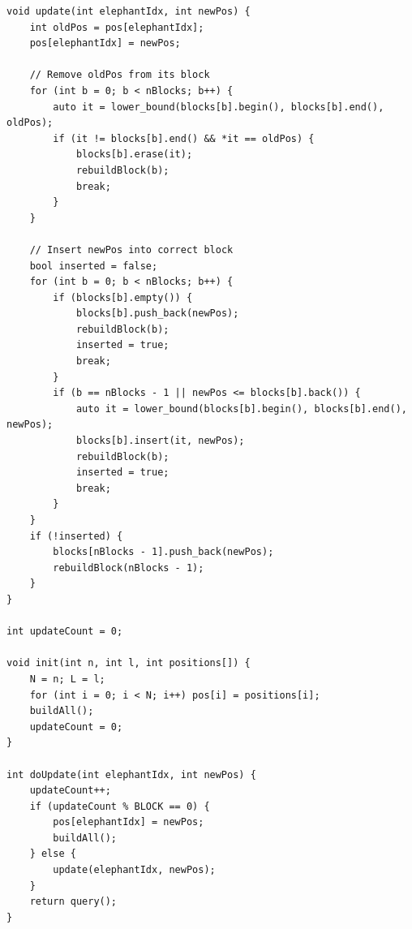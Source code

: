 \documentclass[11pt,a4paper]{article}
\begin{document}
\begin{lstlisting}
void update(int elephantIdx, int newPos) {
    int oldPos = pos[elephantIdx];
    pos[elephantIdx] = newPos;

    // Remove oldPos from its block
    for (int b = 0; b < nBlocks; b++) {
        auto it = lower_bound(blocks[b].begin(), blocks[b].end(), oldPos);
        if (it != blocks[b].end() && *it == oldPos) {
            blocks[b].erase(it);
            rebuildBlock(b);
            break;
        }
    }

    // Insert newPos into correct block
    bool inserted = false;
    for (int b = 0; b < nBlocks; b++) {
        if (blocks[b].empty()) {
            blocks[b].push_back(newPos);
            rebuildBlock(b);
            inserted = true;
            break;
        }
        if (b == nBlocks - 1 || newPos <= blocks[b].back()) {
            auto it = lower_bound(blocks[b].begin(), blocks[b].end(), newPos);
            blocks[b].insert(it, newPos);
            rebuildBlock(b);
            inserted = true;
            break;
        }
    }
    if (!inserted) {
        blocks[nBlocks - 1].push_back(newPos);
        rebuildBlock(nBlocks - 1);
    }
}

int updateCount = 0;

void init(int n, int l, int positions[]) {
    N = n; L = l;
    for (int i = 0; i < N; i++) pos[i] = positions[i];
    buildAll();
    updateCount = 0;
}

int doUpdate(int elephantIdx, int newPos) {
    updateCount++;
    if (updateCount % BLOCK == 0) {
        pos[elephantIdx] = newPos;
        buildAll();
    } else {
        update(elephantIdx, newPos);
    }
    return query();
}
\end{lstlisting}
\end{document}
